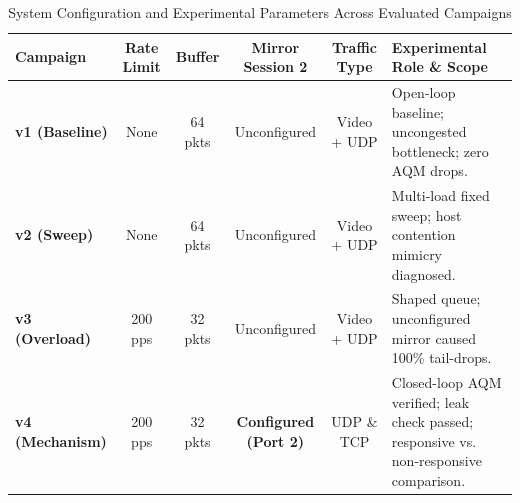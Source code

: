 \begin{table}[H]
\centering
\small
\caption{System Configuration and Experimental Parameters Across Evaluated Campaigns}
\label{tab:campaign_evolution}
\begin{tabularx}{\textwidth}{lccccX}
\toprule
\textbf{Campaign} & \textbf{Rate Limit} & \textbf{Buffer} & \textbf{Mirror Session 2} & \textbf{Traffic Type} & \textbf{Experimental Role \& Scope} \\
\midrule
\textbf{v1 (Baseline)} & None & 64 pkts & Unconfigured & Video + UDP & Open-loop baseline; uncongested bottleneck; zero AQM drops. \\
\textbf{v2 (Sweep)} & None & 64 pkts & Unconfigured & Video + UDP & Multi-load fixed sweep; host contention mimicry diagnosed. \\
\textbf{v3 (Overload)} & 200 pps & 32 pkts & Unconfigured & Video + UDP & Shaped queue; unconfigured mirror caused 100\% tail-drops. \\
\textbf{v4 (Mechanism)} & 200 pps & 32 pkts & \textbf{Configured (Port 2)} & UDP \& TCP & Closed-loop AQM verified; leak check passed; responsive vs. non-responsive comparison. \\
\bottomrule
\end{tabularx}
\end{table}
